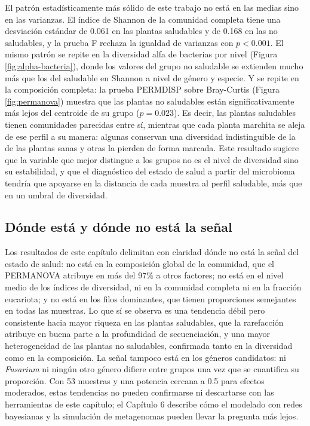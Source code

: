 El patrón estadísticamente más sólido de este trabajo no está en las medias sino en las varianzas.
El índice de Shannon de la comunidad completa tiene una desviación estándar de 0.061 en las plantas
saludables y de 0.168 en las no saludables, y la prueba F rechaza la igualdad de varianzas con
$p < 0.001$. El mismo patrón se repite en la diversidad alfa de bacterias por nivel
(Figura \ref{fig:alpha-bacteria}), donde los valores del grupo no saludable se extienden mucho más
que los del saludable en Shannon a nivel de género y especie. Y se repite en la composición
completa: la prueba PERMDISP sobre Bray-Curtis (Figura \ref{fig:permanova}) muestra que las plantas no
saludables están significativamente más lejos del centroide de su grupo ($p = 0.023$). Es decir, las
plantas saludables tienen comunidades parecidas entre sí, mientras que cada planta marchita se aleja de ese perfil a su
manera: algunas conservan una diversidad indistinguible de la de las plantas sanas y otras la
pierden de forma marcada. Este resultado sugiere que la variable que mejor distingue a los grupos
no es el nivel de diversidad sino su estabilidad, y que el diagnóstico del estado de salud a partir
del microbioma tendría que apoyarse en la distancia de cada muestra al perfil saludable, más que en
un umbral de diversidad.

\subsection{Dónde está y dónde no está la señal}

Los resultados de este capítulo delimitan con claridad dónde no está la señal del estado de salud:
no está en la composición global de la comunidad, que el PERMANOVA atribuye en más del 97\% a
otros factores; no está en el nivel medio de los índices de diversidad, ni en la comunidad completa
ni en la fracción eucariota; y no está en los filos dominantes, que tienen proporciones semejantes
en todas las muestras. Lo que sí se observa es una tendencia débil pero consistente hacia mayor
riqueza en las plantas saludables, que la rarefacción atribuye en buena parte a la profundidad de
secuenciación, y una mayor heterogeneidad de las plantas no saludables, confirmada tanto en la
diversidad como en la composición. La señal tampoco está en los géneros candidatos: ni
\textit{Fusarium} ni ningún otro género difiere entre grupos una vez que se cuantifica su
proporción. Con 53 muestras y una potencia cercana a 0.5 para efectos
moderados, estas tendencias no pueden confirmarse ni descartarse con las herramientas de este
capítulo; el Capítulo 6 describe cómo el modelado con redes bayesianas y la simulación de
metagenomas pueden llevar la pregunta más lejos.

